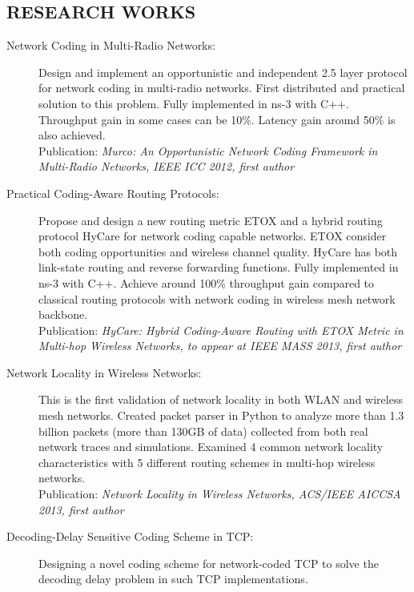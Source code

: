 \documentclass[line]{res}
\begin{document}
\begin{resume}
	\section{RESEARCH WORKS}
	\begin{description}
		\item[Network Coding in Multi-Radio Networks:]
			Design and implement an opportunistic and independent 2.5 layer protocol for network coding in multi-radio networks. First distributed and practical solution to this problem. Fully implemented in ns-3 with C++. Throughput gain in some cases can be 10\%. Latency gain around 50\% is also achieved. \\
			Publication: \emph{Murco: An Opportunistic Network Coding Framework in Multi-Radio Networks, IEEE ICC 2012, first author}
		\item[Practical Coding-Aware Routing Protocols:]
			Propose and design a new routing metric ETOX and a hybrid routing protocol HyCare for network coding capable networks. ETOX consider both coding opportunities and wireless channel quality. HyCare has both link-state routing and reverse forwarding functions. Fully implemented in ns-3 with C++. Achieve around 100\% throughput gain compared to classical routing protocols with network coding in wireless mesh network backbone.\\
			Publication: \emph{HyCare: Hybrid Coding-Aware Routing with ETOX Metric in Multi-hop Wireless Networks, to appear at IEEE MASS 2013, first author}
		\item[Network Locality in Wireless Networks:]
			This is the first validation of network locality in both WLAN and wireless mesh networks. Created packet parser in Python to analyze more than 1.3 billion packets (more than 130GB of data) collected from both real network traces and simulations. Examined 4 common network locality characteristics with 5 different routing schemes in multi-hop wireless networks.\\
			Publication: \emph{Network Locality in Wireless Networks, ACS/IEEE AICCSA 2013, first author}
		\item [Decoding-Delay Sensitive Coding Scheme in TCP:]
			Designing a novel coding scheme for network-coded TCP to solve the decoding delay problem in such TCP implementations.
	\end{description}
	

\end{resume}
\end{document}
